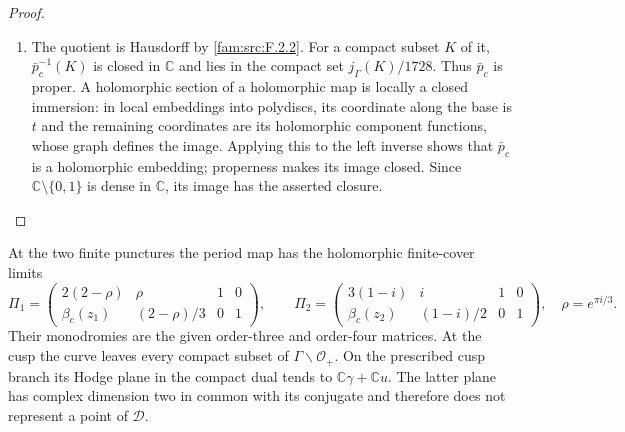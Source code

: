 \begin{proof}
\begin{enumerate}[label=\arabic*.,leftmargin=*]
\item The quotient is Hausdorff by \ref{fam:src:F.2.2}.  For a compact subset $K$ of it,
$\bar p_c^{-1}(K)$ is closed in $\mathbb C$ and lies in the compact set
$j_\Gamma(K)/1728$.  Thus $\bar p_c$ is proper.  A holomorphic section of
a holomorphic map is locally a closed immersion: in local embeddings
into polydiscs, its coordinate along the base is $t$ and the remaining
coordinates are its holomorphic component functions, whose graph
defines the image.  Applying this to the left inverse shows that
$\bar p_c$ is a holomorphic embedding; properness makes its image
closed.  Since $\mathbb C\setminus\{0,1\}$ is dense in $\mathbb C$, its
image has the asserted closure.
\end{enumerate}
\end{proof}

\begin{proposition}\label{fam:src:F.3.2}\label{fam:st:F.3.2}

At the two finite punctures the period map has the holomorphic
finite-cover limits
\[
 \Pi_1=
 \begin{pmatrix}2(2-\rho)&\rho&1&0\\
 \beta_c(z_1)&(2-\rho)/3&0&1\end{pmatrix},\qquad
 \Pi_2=
 \begin{pmatrix}3(1-i)&i&1&0\\
 \beta_c(z_2)&(1-i)/2&0&1\end{pmatrix},
 \quad \rho=e^{\pi i/3}.
\]
Their monodromies are the given order-three and order-four matrices.
At the cusp the curve leaves every compact subset of
$\Gamma\backslash\mathcal O_+$.  On the prescribed cusp branch its
Hodge plane in the compact dual tends to
$\mathbb C\gamma+\mathbb Cu$.  The latter plane has complex dimension
two in common with its conjugate and therefore does not represent a
point of $\mathcal D$.
\end{proposition}



